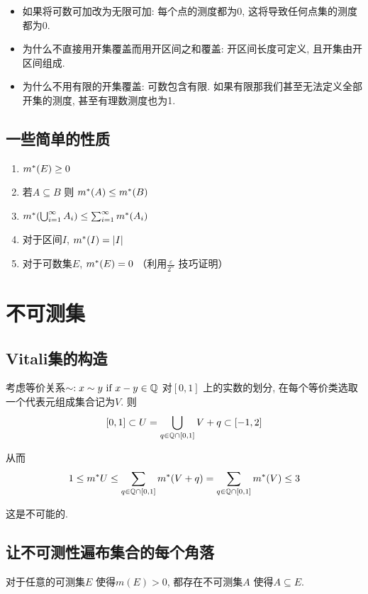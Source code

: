 \begin{itemize}
    \item 如果将可数可加改为无限可加: 每个点的测度都为0, 这将导致任何点集的测度都为0.
    \item 为什么不直接用开集覆盖而用开区间之和覆盖: 开区间长度可定义, 且开集由开区间组成.
    \item 为什么不用有限的开集覆盖: 可数包含有限. 如果有限那我们甚至无法定义全部开集的测度, 甚至有理数测度也为1.
\end{itemize}

\subsection{一些简单的性质}
\begin{enumerate}
    \item \(m^{*}(E)\geq 0\)
    \item 若\(A \subseteq B\) 则 \(m^{*}(A) \leq m^{*}(B)\)
    \item \(m^{*}(\bigcup_{i=1}^{\infty} A_{i}) \leq
        \sum_{i=1}^{\infty} m^{*}(A_{i})\)
    \item 对于区间\(I\), \(m^{*}(I) = |I|\)
    \item 对于可数集\(E\), \(m^{*}(E) = 0\)
        （利用\(\frac{\varepsilon}{2^{n}}\) 技巧证明）

\end{enumerate}

\section{不可测集}

\subsection{Vitali集的构造}
考虑等价关系\(\sim: x\sim y \text{ if } x-y \in \mathbb{Q}\) 对\([0,1]\)
上的实数的划分, 在每个等价类选取一个代表元组成集合记为\(V\). 则\[
    [0,1] \subset U=\bigcup_{q \in \mathbb{Q}\cap[0,1]} V+q \subset [-1,2]
\]

从而\[
    1\leq m^{*} U \leq \sum_{q \in \mathbb{Q}\cap[0,1]} m^{*}(V+q) = \sum_{q \in
    \mathbb{Q}\cap[0,1]} m^{*}(V) \leq 3
\]

这是不可能的.

\subsection{让不可测性遍布集合的每个角落}
\begin{theorem}
    对于任意的可测集\(E\) 使得\(m(E)>0\), 都存在不可测集\(A\) 使得\(A \subseteq E\).
\end{theorem}

